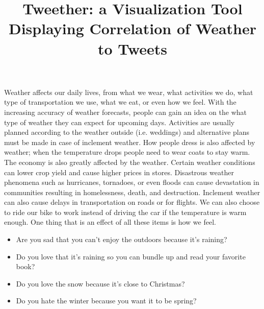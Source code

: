 \documentclass[journal]{vgtc}                %
\title{Tweether: a Visualization Tool Displaying Correlation of Weather to Tweets}
\author{}
\begin{document}

\maketitle

Weather affects our daily lives, from what we wear, what activities we do, what type of transportation we use, what we eat, or even how we feel.  With the increasing accuracy of weather forecasts, people can gain an idea on the what type of weather they can expect for upcoming days. Activities are usually planned according to the weather outside (i.e. weddings) and alternative plans must be made in case of inclement weather. How people dress is also affected by weather; when the temperature drops people need to wear coats to stay warm. The economy is also greatly affected by the weather. Certain weather conditions can lower crop yield and cause higher prices in stores. Disastrous weather phenomena such as hurricanes, tornadoes, or even floods can cause devastation in communities resulting in homelessness, death, and destruction. Inclement weather can also cause delays in transportation on roads or for flights. We can also choose to ride our bike to work instead of driving the car if the temperature is warm enough. One thing that is an effect of all these items is how we feel.

\begin{itemize}
\item Are you sad that you can't enjoy the outdoors because it's raining?
\item Do you love that it's raining so you can bundle up and read your favorite book?
\item Do you love the snow because it's close to Christmas?
\item Do you hate the winter because you want it to be spring?
\end{itemize}
\end{document}

